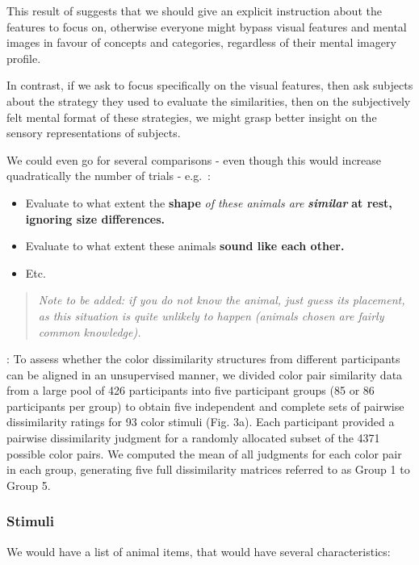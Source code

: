 \documentclass[
  authoryear]{elsarticle}
\begin{document}
This result of \citet{jozwik2017} suggests that we should give an
explicit instruction about the features to focus on, otherwise everyone
might bypass visual features and mental images in favour of concepts and
categories, regardless of their mental imagery profile.

In contrast, if we ask to focus specifically on the visual features,
then ask subjects about the strategy they used to evaluate the
similarities, then on the subjectively felt mental format of these
strategies, we might grasp better insight on the sensory representations
of subjects.

We could even go for several comparisons - even though this would
increase quadratically the number of trials - e.g.~:

\begin{itemize}
\item
  Evaluate to what extent the \textbf{shape} \emph{of these animals are}
  \textbf{\emph{similar}} \textbf{at rest, ignoring size differences.}
\item
  Evaluate to what extent these animals \textbf{sound like each other.}
\item
  Etc.
\end{itemize}

\begin{quote}
\emph{Note to be added: if you do not know the animal, just guess its
placement, as this situation is quite unlikely to happen (animals chosen
are fairly common knowledge).}
\end{quote}

\citet{kawakita2023}: To assess whether the color dissimilarity
structures from different participants can be aligned in an unsupervised
manner, we divided color pair similarity data from a large pool of 426
participants into five participant groups (85 or 86 participants per
group) to obtain five independent and complete sets of pairwise
dissimilarity ratings for 93 color stimuli (Fig. 3a). Each participant
provided a pairwise dissimilarity judgment for a randomly allocated
subset of the 4371 possible color pairs. We computed the mean of all
judgments for each color pair in each group, generating five full
dissimilarity matrices referred to as Group 1 to Group 5.

\subsubsection{Stimuli}\label{stimuli}

We would have a list of animal items, that would have several
characteristics:
\end{document}

